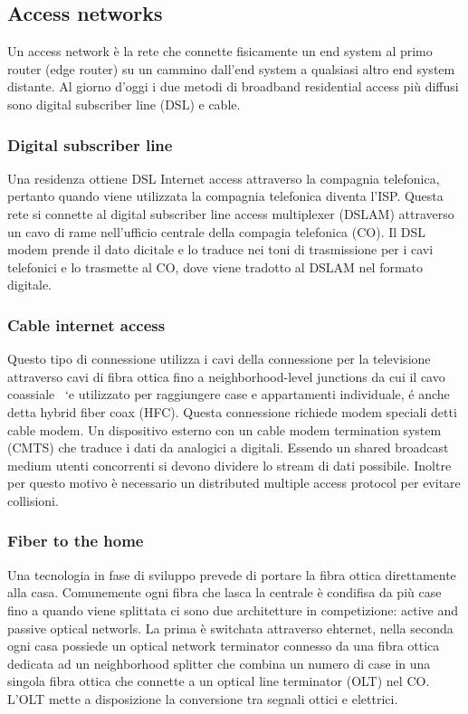 \subsection{Access networks}
Un access network \`e la rete che connette fisicamente un end system al primo router (edge router) su un cammino dall'end system a qualsiasi altro end system distante. Al giorno d'oggi i due metodi di
broadband residential access pi\`u diffusi sono digital subscriber line (DSL) e cable. 
\subsubsection{Digital subscriber line}
Una residenza ottiene DSL Internet access attraverso la compagnia telefonica, pertanto quando viene utilizzata la compagnia
telefonica diventa l'ISP. Questa rete si connette al digital subscriber line access multiplexer (DSLAM) attraverso un cavo di rame nell'ufficio centrale della compagia telefonica (CO).  Il DSL modem prende il
dato dicitale e lo traduce nei toni di trasmissione per i cavi telefonici e lo trasmette al CO, dove viene tradotto al DSLAM nel formato digitale. 
\subsubsection{Cable internet access}
Questo tipo di connessione utilizza i cavi della connessione per la televisione attraverso cavi di fibra ottica fino a neighborhood-level junctions da cui il cavo coassiale \ `e utilizzato per raggiungere case e 
appartamenti individuale, \'e anche detta hybrid fiber coax (HFC). Questa connessione richiede modem speciali detti cable modem. Un dispositivo esterno con un cable modem termination system (CMTS)
che traduce i dati da analogici a digitali. Essendo un shared broadcast medium utenti concorrenti si devono dividere lo stream di dati possibile. Inoltre per questo motivo \`e necessario un distributed multiple 
access protocol per evitare collisioni. 
\subsubsection{Fiber to the home}
Una tecnologia in fase di sviluppo prevede di portare la fibra ottica direttamente alla casa. Comunemente ogni fibra che lasca la centrale \`e condifisa da pi\`u case fino a quando viene splittata ci sono
due architetture in competizione: active and passive optical networls. La prima \`e switchata attraverso ehternet, nella seconda ogni casa possiede un optical network terminator connesso da una fibra ottica 
dedicata ad un neighborhood splitter che combina un numero di case in una singola fibra ottica che connette a un optical line terminator (OLT) nel CO. L'OLT mette a disposizione la conversione tra segnali
ottici e elettrici. 
